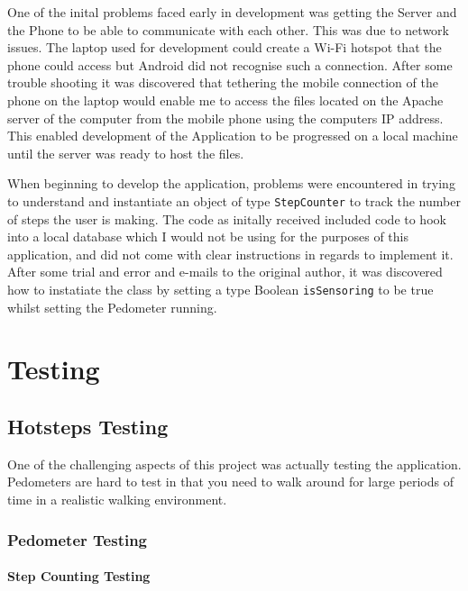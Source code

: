 \documentclass{l4proj}
\begin{document}
One of the inital problems faced early in development was getting the Server and the Phone to be able to communicate with each other. This was due to network issues. The laptop used for development could create a Wi-Fi hotspot that the phone could access but Android did not recognise such a connection. After some trouble shooting it was discovered that tethering the mobile connection of the phone on the laptop would enable me to access the files located on the Apache server of the computer from the mobile phone using the computers IP address. This enabled development of the Application to be progressed on a local machine until the server was ready to host the files. 

When beginning to develop the application, problems were encountered in trying to understand and instantiate an object of type \texttt{StepCounter} to track the number of steps the user is making. The code as initally received included code to hook into a local database which I would not be using for the purposes of this application, and did not come with clear instructions in regards to implement it. After some trial and error and e-mails to the original author, it was discovered how to instatiate the class by setting a type Boolean \texttt{isSensoring} to be true whilst setting the Pedometer running.


\chapter{Testing}

\section{Hotsteps Testing}

One of the challenging aspects of this project was actually testing the application. Pedometers are hard to test in that you need to walk around for large periods of time in a realistic walking environment.

\subsection{Pedometer Testing}

\subsubsection{Step Counting Testing}
\end{document}
